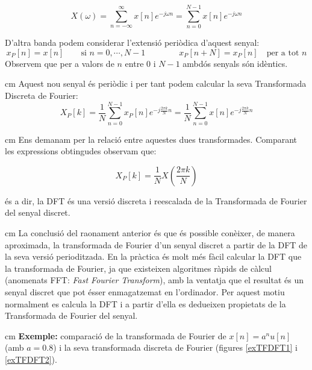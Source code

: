 \documentclass{article}
\begin{document}
\[
X(\omega)=\sum_{n=-\infty}^\infty x[n] e^{-j\omega n}=\sum_{n=0}^{N-1} x[n] e^{-j\omega n}
\]

D'altra banda podem considerar l'extensi\'o peri\`odica d'aquest senyal:
\[
x_P[n]=x[n] \qquad \text{si } n=0, \cdots, N-1 \qquad \qquad x_P[n+N]=x_P[n] \quad \text{per a tot } n
\]
\noindent
Observem que per a valors de $n$ entre $0$ i $N-1$ ambd\'os senyals s\'on id\`entics.

 cm
\noindent
Aquest nou senyal \'es peri\`odic i per tant podem calcular la seva Transformada Discreta de Fourier:
\[
X_P[k]=\frac{1}{N}\sum_{n=0}^{N-1} x_P[n] e^{-j \frac{2 \pi k}{N} n} =\frac{1}{N}\sum_{n=0}^{N-1} x[n] e^{-j \frac{2 \pi k}{N} n} 
\]

 cm
\noindent
Ens demanam per la relaci\'o entre aquestes dues transformades. Comparant les expressions obtingudes observam que:
 
\[
X_P[k]=\frac{1}{N}X(\frac{2\pi k}{N})
\]

\'es a dir, la DFT \'es una versi\'o discreta i reescalada de la Transformada de Fourier del senyal discret.


 cm
La conclusi\'o del raonament anterior \'es que \'es possible con\`eixer, de manera aproximada, 
la transformada de Fourier d'un senyal discret a partir de la DFT de la seva versi\'o perioditzada.
En la pr\`actica \'es molt m\'es f\`acil calcular la DFT que la transformada de Fourier, ja que existeixen
algoritmes r\`apids de c\`alcul (anomenats FFT: \textit{Fast Fourier Transform}), amb la ventatja
que el resultat \'es un senyal discret que pot \'esser enmagatzemat en l'ordinador. Per aquest motiu
normalment es calcula la DFT i a partir d'ella es dedueixen propietats de la Transformada de Fourier del senyal.


 cm
\noindent
\textbf{Exemple:} comparaci\'o de la transformada de Fourier de $x[n]=a^n u[n]$ (amb $a=0.8$) i la seva transformada
discreta de Fourier (figures \ref{exTFDFT1} i \ref{exTFDFT2}).
\end{document}
